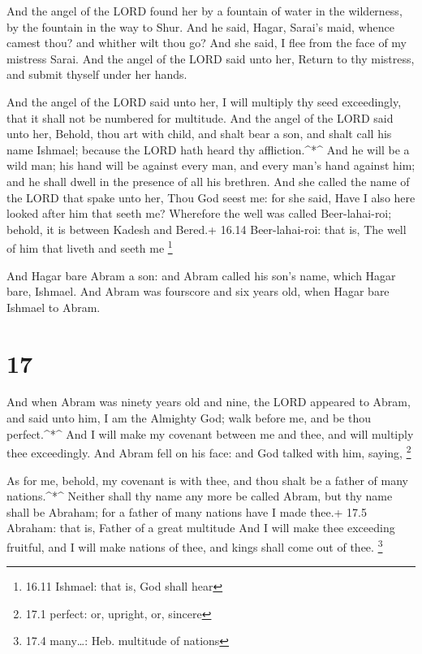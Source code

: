  And the angel of the LORD found her by a fountain of water
in the wilderness, by the fountain in the way to Shur.  And
he said, Hagar, Sarai's maid, whence camest thou? and whither wilt thou
go? And she said, I flee from the face of my mistress Sarai.
 And the angel of the LORD said unto her, Return to thy
mistress, and submit thyself under her hands.

 And the angel of the LORD said unto her, I will multiply
thy seed exceedingly, that it shall not be numbered for multitude.
 And the angel of the LORD said unto her, Behold, thou art
with child, and shalt bear a son, and shalt call his name Ishmael;
because the LORD hath heard thy affliction.\^{}*\^{}  And
he will be a wild man; his hand will be against every man, and every
man's hand against him; and he shall dwell in the presence of all his
brethren.  And she called the name of the LORD that spake
unto her, Thou God seest me: for she said, Have I also here looked after
him that seeth me?  Wherefore the well was called
Beer-lahai-roi; behold, it is between Kadesh and Bered.+ 16.14
Beer-lahai-roi: that is, The well of him that liveth and seeth me
\footnote{16.11 Ishmael: that is, God shall hear}

 And Hagar bare Abram a son: and Abram called his son's
name, which Hagar bare, Ishmael.  And Abram was fourscore
and six years old, when Hagar bare Ishmael to Abram.

\hypertarget{section-16}{%
\section{17}\label{section-16}}

 And when Abram was ninety years old and nine, the LORD
appeared to Abram, and said unto him, I am the Almighty God; walk before
me, and be thou perfect.\^{}*\^{}  And I will make my
covenant between me and thee, and will multiply thee exceedingly.
 And Abram fell on his face: and God talked with him,
saying, \footnote{17.1 perfect: or, upright, or, sincere}

 As for me, behold, my covenant is with thee, and thou shalt
be a father of many nations.\^{}*\^{}  Neither shall thy
name any more be called Abram, but thy name shall be Abraham; for a
father of many nations have I made thee.+ 17.5 Abraham: that is, Father
of a great multitude  And I will make thee exceeding
fruitful, and I will make nations of thee, and kings shall come out of
thee. \footnote{17.4 many\ldots: Heb. multitude of nations}

